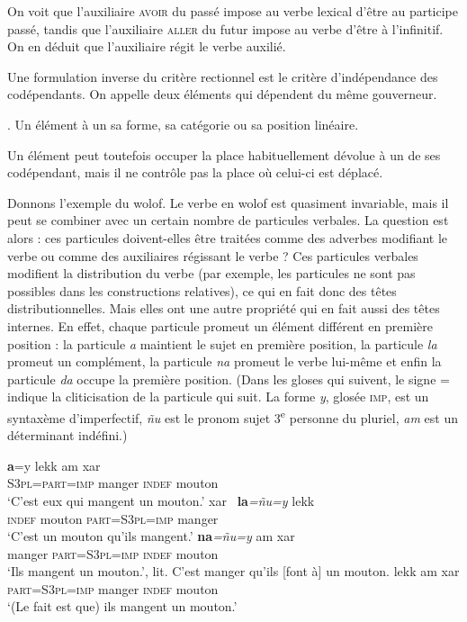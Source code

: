 On voit que l’auxiliaire \textsc{avoir} du passé impose au verbe lexical d’être au participe passé, tandis que l’auxiliaire \textsc{aller} du futur impose au verbe d’être à l’infinitif. On en déduit que l’auxiliaire régit le verbe auxilié.

Une formulation inverse du critère rectionnel est le critère d’indépendance des codépendants. On appelle  deux éléments qui dépendent du même gouverneur.

{. Un élément  à un  sa forme, sa catégorie ou sa position linéaire.}

Un élément peut toutefois occuper la place habituellement dévolue à un de ses codépendant, mais il ne contrôle pas la place où celui-ci est déplacé.

Donnons l’exemple du wolof. Le verbe en wolof est quasiment invariable, mais il peut se combiner avec un certain nombre de particules verbales. La question est alors : ces particules doivent-elles être traitées comme des adverbes modifiant le verbe ou comme des auxiliaires régissant le verbe ? Ces particules verbales modifient la distribution du verbe (par exemple, les particules ne sont pas possibles dans les constructions relatives), ce qui en fait donc des têtes distributionnelles. Mais elles ont une autre propriété qui en fait aussi des têtes internes. En effet, chaque particule promeut un élément différent en première position : la particule \textit{a} maintient le sujet en première position, la particule \textit{la} promeut un complément, la particule \textit{na} promeut le verbe lui-même et enfin la particule \textit{da} occupe la première position. (Dans les gloses qui suivent, le signe = indique la cliticisation de la particule qui suit. La forme \textit{y}, glosée \textsc{imp}, est un syntaxème d'imperfectif, \textit{ñu} est le pronom sujet 3\textsuperscript{e} personne du pluriel, \textit{am} est un déterminant indéfini.)

\ea
\ea
{}\textbf{{a}}{=y}                {lekk}          {am}       {xar~}\\
\textsc{S3pl=part=imp} manger  \textsc{indef}  mouton\\
\glt `C’est eux qui mangent un mouton.’
\ex
{}       {xar~}          \textbf{{la}}\textit{=ñu=y}               {lekk}\\
\textsc{indef}  mouton  \textsc{part=S3pl=imp} manger\\
\glt `C’est un mouton qu’ils mangent.’
\ex
{}       \textbf{{na}}\textit{=ñu=y}             {am}       {xar~}\\
manger  \textsc{part=S3pl=imp} \textsc{indef}  mouton\\
\glt `Ils mangent un mouton.’, lit. C'est manger qu'ils [font à] un mouton.
\ex
{}   lekk         am      xar\\
\textsc{part=S3pl=imp}    manger  \textsc{indef}  mouton\\
\glt `(Le fait est que) ils mangent un mouton.’
\z
\z

